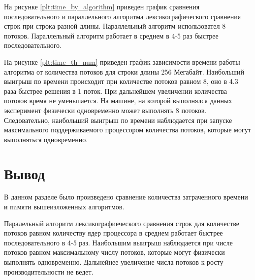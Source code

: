         На рисунке \ref{plt:time_by_algorithm} приведен график сравнения последовательного и параллельного алгоритма лексикографического сравнения строк при строка разной длины. Параллельный алгоритм использовател 8 потоков. Параллельный алгоритм работает в среднем в 4-5 раз быстрее последовательного.
        
        На рисунке \ref{plt:time_th_num} приведен график зависимости времени работы алгоритма от количества потоков для строки длины 256 Мегабайт. Наибольший выигрыш по времени происходит при количестве потоков равном 8, оно в 4.3 раза быстрее решения в 1 поток. При дальнейшем увеличении количества потоков время не уменьшается. На машине, на которой выполнялся данных эксперимент физически одновременно может выполнять 8 потоков. Следовательно, наибольший выигрыш по времени наблюдается при запуске максимального поддерживаемого процессором количества потоков, которые могут выполняться одновременно. 
    
    \section*{Вывод}
    
        В данном разделе было произведено сравнение количества затраченного времени и пaмяти вышеизложенных алгоритмов. 
        
        Паралельный алгоритм лексикографиеческого сравнения строк для количестве потоков равном количеству ядер процессора в среднем работает быстрее последовательного в 4-5 раз. Наибольшим выигрыш наблюдается при числе потоков равном максимальному числу потоков, которые могут физически выполнять одновременно. Дальнейнее увеличение числа потоков к росту производительности не ведет.
        